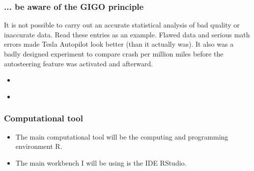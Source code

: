 \documentclass{beamer}
\begin{document}
\begin{frame}
\frametitle{... be aware of the GIGO principle}

It is not possible to carry out an accurate statistical analysis of bad quality or inaccurate data. Read these  entries as an example. Flawed data and serious math errors made Tesla Autopilot look better (than it actually was). It also was a badly designed experiment to compare crash per million miles before the autosteering feature was activated and afterward. \\[10pt]
\begin{itemize}
\item \href{https://junkcharts.typepad.com/numbersruleyourworld/2019/03/excel-error-but-could-happen-in-any-tool.html}{}
\item \href{https://arstechnica.com/cars/2019/02/in-2017-the-feds-said-tesla-autopilot-cut-crashes-40-that-was-bogus/}{}
\end{itemize}
\end{frame}
\begin{frame}
\frametitle{Computational tool}
\begin{itemize}
\item The main computational tool will be the computing and programming environment R.
\item The main workbench I will be using is the IDE RStudio.
\end{itemize}
\end{frame}
\end{document}
